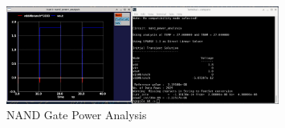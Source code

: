 \documentclass{article}
\begin{document}
	\begin{figure}[H]
		\centerline{\includegraphics[width=0.8\textwidth]{nand_power_analysis.png}}
		\caption{NAND Gate Power Analysis}
		\label{fig::nand_power_analysis}
	\end{figure}
\end{document}
